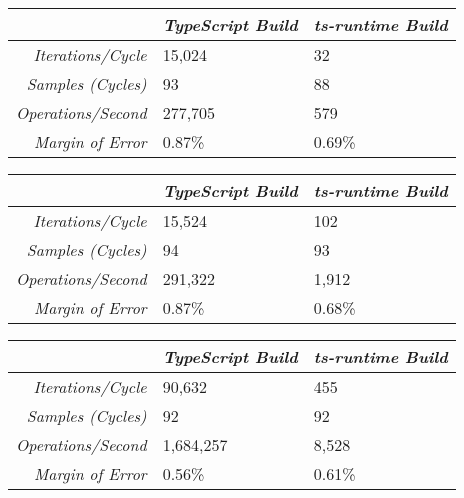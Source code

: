 \begin{minipage}{\textwidth}
\begin{center}
{
\centering
\tabulinesep=1.2mm
\setlength{\tabcolsep}{5mm}
\def\arraystretch{1.25}
\small
\begin{tabu} to \textwidth {|r||X[c,m]|X[c,m]|}
  \hline
  & \emph{TypeScript Build} & \emph{ts-runtime Build} \\
  \hline
  \hline
  \emph{Iterations/Cycle}  & 15,024 & 32 \\
  \hline
  \emph{Samples (Cycles)}  & 93 & 88 \\
  \hline
  \emph{Operations/Second} & 277,705 & 579 \\
  \hline
  \emph{Margin of Error}   & 0.87\% & 0.69\% \\
  \hline
\end{tabu}
}
\end{center}

\begin{center}
{
\centering
\tabulinesep=1.2mm
\setlength{\tabcolsep}{5mm}
\def\arraystretch{1.25}
\small
\begin{tabu} to \textwidth {|r||X[c,m]|X[c,m]|}
  \hline
  & \emph{TypeScript Build} & \emph{ts-runtime Build} \\
  \hline
  \hline
  \emph{Iterations/Cycle}  & 15,524 & 102 \\
  \hline
  \emph{Samples (Cycles)}  & 94 & 93 \\
  \hline
  \emph{Operations/Second} & 291,322 & 1,912 \\
  \hline
  \emph{Margin of Error}   & 0.87\% & 0.68\% \\
  \hline
\end{tabu}
}
\end{center}
\end{minipage}

\begin{center}
{
\centering
\tabulinesep=1.2mm
\setlength{\tabcolsep}{5mm}
\def\arraystretch{1.25}
\small
\begin{tabu} to \textwidth {|r||X[c,m]|X[c,m]|}
  \hline
  & \emph{TypeScript Build} & \emph{ts-runtime Build} \\
  \hline
  \hline
  \emph{Iterations/Cycle}  & 90,632 & 455 \\
  \hline
  \emph{Samples (Cycles)}  & 92 & 92 \\
  \hline
  \emph{Operations/Second} & 1,684,257 & 8,528 \\
  \hline
  \emph{Margin of Error}   & 0.56\% & 0.61\% \\
  \hline
\end{tabu}
}
\end{center}

